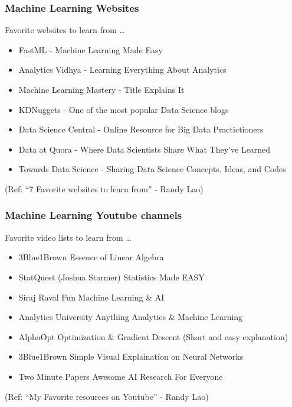 \begin{frame}\frametitle{Machine Learning Websites}
Favorite websites to learn from \ldots

\footnotesize
\begin{itemize}
\item FastML - Machine Learning Made Easy
\item Analytics Vidhya - Learning Everything About Analytics
\item Machine Learning Mastery - Title Explains It
\item KDNuggets - One of the most popular Data Science blogs
\item Data Science Central - Online Resource for Big Data Practictioners
\item Data at Quora - Where Data Scientists Share What They've Learned
\item Towards Data Science - Sharing Data Science Concepts, Ideas, and Codes
\end{itemize}

(Ref: ``7 Favorite websites to learn from'' - Randy Lao)
\end{frame}

\begin{frame}\frametitle{Machine Learning Youtube channels}
Favorite video lists to learn from \ldots

\footnotesize
\begin{itemize}
\item 3Blue1Brown
Essence of Linear Algebra
\item StatQuest (Joshua Starmer)
Statistics Made EASY
\item Siraj Raval
Fun Machine Learning \& AI  
\item Analytics University
Anything Analytics \& Machine Learning
\item AlphaOpt
Optimization \& Gradient Descent (Short and easy explanation)
\item 3Blue1Brown
Simple Visual Explaination on Neural Networks
\item Two Minute Papers
Awesome AI Research For Everyone 
\end{itemize}

(Ref: ``My Favorite resources on Youtube'' - Randy Lao)
\end{frame}


